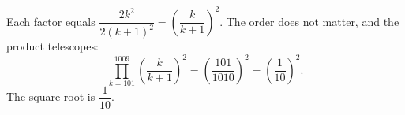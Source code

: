 Each factor equals $\dfrac{2k^2}{2(k+1)^2}=\left(\dfrac{k}{k+1}\right)^2$. The order does not matter, and the product telescopes:
\[\prod_{k=101}^{1009}\left(\dfrac{k}{k+1}\right)^2=\left(\dfrac{101}{1010}\right)^2=\left(\dfrac1{10}\right)^2.\]
The square root is $\boxed{\dfrac1{10}}$.
